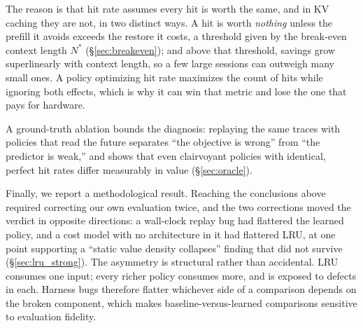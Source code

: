 \documentclass[letterpaper,twocolumn,10pt]{article}
\begin{document}
The reason is that hit rate assumes every hit is worth the same, and in KV caching they are not, in two distinct ways. A hit is worth \emph{nothing} unless the prefill it avoids exceeds the restore it costs, a threshold given by the break-even context length $N^{*}$ (\S\ref{sec:breakeven}); and above that threshold, savings grow superlinearly with context length, so a few large sessions can outweigh many small ones. A policy optimizing hit rate maximizes the count of hits while ignoring both effects, which is why it can win that metric and lose the one that pays for hardware.

A ground-truth ablation bounds the diagnosis: replaying the same traces with policies that read the future separates ``the objective is wrong'' from ``the predictor is weak,'' and shows that even clairvoyant policies with identical, perfect hit rates differ measurably in value (\S\ref{sec:oracle}).

Finally, we report a methodological result. Reaching the conclusions above required correcting our own evaluation twice, and the two corrections moved the verdict in opposite directions: a wall-clock replay bug had flattered the learned policy, and a cost model with no architecture in it had flattered LRU, at one point supporting a ``static value density collapses'' finding that did not survive (\S\ref{sec:lru_strong}). The asymmetry is structural rather than accidental. LRU consumes one input; every richer policy consumes more, and is exposed to defects in each. Harness bugs therefore flatter whichever side of a comparison depends on the broken component, which makes baseline-versus-learned comparisons sensitive to evaluation fidelity.
\end{document}
